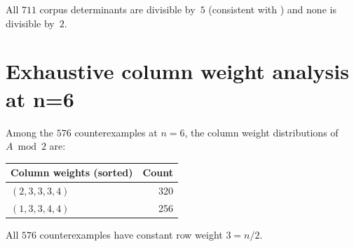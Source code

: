 \documentclass[11pt,a4paper]{article}
\begin{document}
\noindent
All $711$ corpus determinants are divisible by~$5$ (consistent with
) and none is divisible by~$2$.

\section{Exhaustive column weight analysis at n=6}\label{app:n6weights}

Among the $576$ counterexamples at $n=6$, the column weight distributions
of $A\bmod 2$ are:

\begin{center}
\begin{tabular}{lr}
  \toprule
  Column weights (sorted) & Count \\
  \midrule
  $(2,3,3,3,4)$ & 320 \\
  $(1,3,3,4,4)$ & 256 \\
  \bottomrule
\end{tabular}
\end{center}

\noindent
All $576$ counterexamples have constant row weight $3=n/2$.
\end{document}
